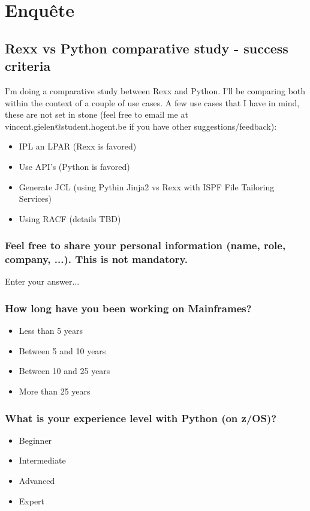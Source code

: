 \chapter{Enquête}%
\label{ch:Enquête}

\section{Rexx vs Python comparative study - success criteria}
I'm doing a comparative study between Rexx and Python. I'll be comparing both within the context of a couple of use cases.
A few use cases that I have in mind, these are not set in stone (feel free to email me at vincent.gielen@student.hogent.be if you have other suggestions/feedback):
\begin{itemize}
    \item IPL an LPAR (Rexx is favored)
    \item Use API's (Python is favored)
    \item Generate JCL (using Pythin Jinja2 vs Rexx with ISPF File Tailoring Services)
    \item Using RACF (details TBD)
\end{itemize}

\subsection{Feel free to share your personal information (name, role, company, ...). This is not mandatory.}
Enter your answer...

\subsection{How long have you been working on Mainframes?}
\begin{itemize}
    \item Less than 5 years
    \item Between 5 and 10 years
    \item Between 10 and 25 years
    \item More than 25 years
\end{itemize}

\subsection{What is your experience level with Python (on z/OS)?}
\begin{itemize}
    \item Beginner
    \item Intermediate
    \item Advanced
    \item Expert
\end{itemize}

